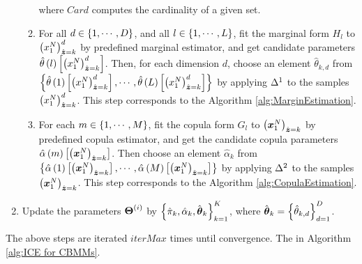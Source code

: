 \begin{enumerate}
\begin{enumerate}
\begin{equation}
            \end{equation}
        where $Card$ computes the cardinality of a given set.
        \item For all $d\in\left\{1,\cdots,D\right\}$, and all $l\in\left\{1,\cdots,L\right\}$, fit the marginal form $H_l$ to $\left(x_1^N\right)_{\hat{\mathrm{\boldsymbol{z}}}=k}^d$
         by predefined marginal estimator, and get candidate parameters $\hat{\theta}\left(l\right)\left[\left(x_1^N\right)_{\hat{\mathrm{\boldsymbol{z}}}=k}^d\right]$. Then, for each dimension $d$, choose an element $\hat{\theta}_{k,d}$ from $\left\{\hat{\theta}\left(1\right)\left[\left(x_1^N\right)_{\hat{\mathrm{\boldsymbol{z}}}=k}^d\right],\cdots,\hat{\theta}\left(L\right)\left[\left(x_1^N\right)_{\hat{\mathrm{\boldsymbol{z}}}=k}^d\right]\right\}$ by applying $\blueC{\Delta}^1$ to the samples $\left(x_1^N\right)_{\hat{\mathrm{\boldsymbol{z}}}=k}^d$.
        This step corresponds to the Algorithm \ref{alg:MarginEstimation}.
        \item For each $m\in\left\{1,\cdots,M\right\}$, fit the copula form $G_l$ to $\left(\boldsymbol{x}_1^N\right)_{\hat{\mathrm{\boldsymbol{z}}}=k}$ by predefined copula estimator, and get the candidate copula parameters $\hat{\alpha}\left(m\right)\left[\left(\boldsymbol{x}_1^N\right)_{\hat{\mathrm{\boldsymbol{z}}}=k}\right]$. Then choose an element $\hat{\alpha}_k$ from $\left\{\hat{\alpha}\left(1\right)\left[\left(\boldsymbol{x}_1^N\right)_{\hat{\mathrm{\boldsymbol{z}}}=k}\right],\cdots,\hat{\alpha}\left(M\right)\left[\left(\boldsymbol{x}_1^N\right)_{\hat{\mathrm{\boldsymbol{z}}}=k}\right]\right\}$ by applying $\blueC{\Delta}^2$ to the samples $\left(\boldsymbol{x}_1^N\right)_{\hat{\mathrm{\boldsymbol{z}}}=k}$.
        This step corresponds to the Algorithm \ref{alg:CopulaEstimation}.
    \end{enumerate}
    \item Update the parameters $\boldsymbol{\Theta}^{(i)}$ by $\left\{\hat{\pi}_k, \hat{\alpha}_k, \hat{\boldsymbol{\theta}}_k\right\}_{k=1}^K$, where $\hat{\boldsymbol{\theta}}_k=\left\{\hat{\theta}_{k,d}\right\}_{d=1}^D$.
\end{enumerate}
The above steps are iterated $iterMax$ times until convergence. The  in Algorithm \ref{alg:ICE for CBMMs}.

